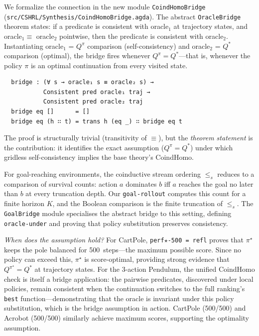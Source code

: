 \documentclass[9pt,a4paper]{article}
\newcommand{\fpath}[1]{\nolinkurl{#1}}
\theoremstyle{plain}
\theoremstyle{definition}
\theoremstyle{remark}
\begin{document}
We formalize the connection in the new module \texttt{CoindHomoBridge} (\fpath{src/CSHRL/Synthesis/CoindHomoBridge.agda}).  The abstract \texttt{OracleBridge} theorem states: if a predicate is consistent with oracle$_1$ at trajectory states, and oracle$_1 \equiv$ oracle$_2$ pointwise, then the predicate is consistent with oracle$_2$.  Instantiating oracle$_1$ = $Q^\pi$ comparison (self-consistency) and oracle$_2$ = $Q^*$ comparison (optimal), the bridge fires whenever $Q^\pi = Q^*$---that is, whenever the policy $\pi$ is an optimal continuation from every visited state.

\begin{verbatim}
  bridge : (∀ s → oracle₁ s ≡ oracle₂ s) →
           Consistent pred oracle₁ traj →
           Consistent pred oracle₂ traj
  bridge eq []      = []
  bridge eq (h ∷ t) = trans h (eq _) ∷ bridge eq t
\end{verbatim}

\noindent The proof is structurally trivial (transitivity of $\equiv$), but the \emph{theorem statement} is the contribution: it identifies the exact assumption ($Q^\pi = Q^*$) under which gridless self-consistency implies the base theory's CoindHomo.

For goal-reaching environments, the coinductive stream ordering $\leq_s$ reduces to a comparison of survival counts: action $a$ dominates $b$ iff $a$ reaches the goal no later than $b$ at every truncation depth.  Our \texttt{goal-rollout} computes this count for a finite horizon $K$, and the Boolean comparison is the finite truncation of $\leq_s$.  The \texttt{GoalBridge} module specialises the abstract bridge to this setting, defining \texttt{oracle-under} and proving that policy substitution preserves consistency.

\emph{When does the assumption hold?}  For CartPole, \texttt{perf$\star$-500 = refl} proves that $\pi^\star$ keeps the pole balanced for 500~steps---the maximum possible score.  Since no policy can exceed this, $\pi^\star$ is score-optimal, providing strong evidence that $Q^{\pi^\star} = Q^*$ at trajectory states.  For the 3-action Pendulum, the unified CoindHomo check is itself a bridge application: the pairwise predicates, discovered under local policies, remain consistent when the continuation switches to the full ranking's \texttt{best} function---demonstrating that the oracle is invariant under this policy substitution, which is the bridge assumption in action.  CartPole (500/500) and Acrobot (500/500) similarly achieve maximum scores, supporting the optimality assumption.
\end{document}
